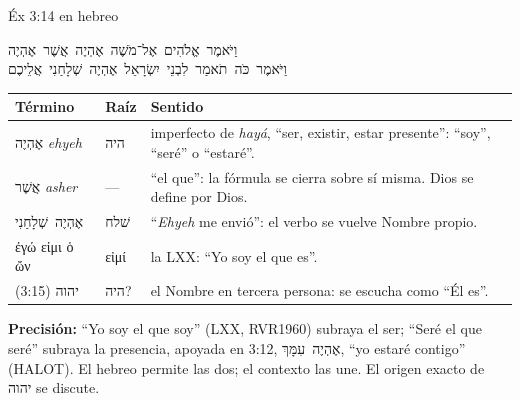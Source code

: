 \documentclass[hyperref={bookmarks=false},aspectratio=169]{beamer}
\newcommand{\heb}[1]{\mbox{\foreignlanguage{hebrew}{#1}}}
\newcommand{\grc}[1]{\foreignlanguage{ancientgreek}{#1}}
\newcommand{\precision}[1]{{\footnotesize\color{gris}\textbf{Precisión:} #1}}
\begin{document}
\begin{frame}{Éx 3:14 en hebreo}
\begin{center}
\heb{וַיֹּאמֶר אֱלֹהִים אֶל־מֹשֶׁה אֶהְיֶה אֲשֶׁר אֶהְיֶה}\\[2pt]
\heb{וַיֹּאמֶר כֹּה תֹאמַר לִבְנֵי יִשְׂרָאֵל אֶהְיֶה שְׁלָחַנִי אֲלֵיכֶם}
\end{center}
\renewcommand{\arraystretch}{1.12}\scriptsize
\begin{tabular}{@{}>{\RaggedRight\arraybackslash}p{2.9cm}>{\RaggedRight\arraybackslash}p{1.2cm}>{\RaggedRight\arraybackslash}p{7.7cm}@{}}
\toprule
\textbf{Término} & \textbf{Raíz} & \textbf{Sentido} \\ \midrule
\heb{אֶהְיֶה} \emph{ehyeh} & \heb{היה} & imperfecto de \emph{hayá}, ``ser, existir, estar presente'': ``soy'', ``seré'' o ``estaré''. \\
\heb{אֲשֶׁר} \emph{asher} & --- & ``el que'': la fórmula se cierra sobre sí misma. Dios se define por Dios. \\
\heb{אֶהְיֶה שְׁלָחַנִי} & \heb{שׁלח} & ``\emph{Ehyeh} me envió'': el verbo se vuelve Nombre propio. \\
\grc{ἐγώ εἰμι ὁ ὤν} & \grc{εἰμί} & la LXX: ``Yo soy el que es''. \\
\heb{יהוה} (3:15) & \heb{היה}? & el Nombre en tercera persona: se escucha como ``Él es''. \\
\bottomrule
\end{tabular}\par\smallskip
\precision{``Yo soy el que soy'' (LXX, RVR1960) subraya el ser; ``Seré el que seré'' subraya la presencia, apoyada en 3:12, \heb{אֶהְיֶה עִמָּךְ}, ``yo estaré contigo'' (HALOT). El hebreo permite las dos; el contexto las une. El origen exacto de \heb{יהוה} se discute.}
\end{frame}
\end{document}

